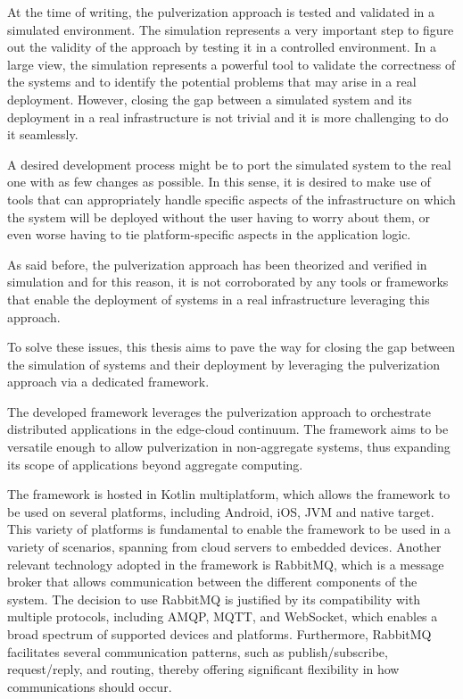 At the time of writing, the pulverization approach is tested and validated in a simulated environment.
The simulation represents a very important step to figure out the validity of the approach by testing it in a controlled environment.
In a large view, the simulation represents a powerful tool to validate the correctness of the systems and to identify the
potential problems that may arise in a real deployment. However, closing the gap between a simulated system and its deployment in a real
infrastructure is not trivial and it is more challenging to do it seamlessly.

A desired development process might be to port the simulated system to the real one with as few changes as possible. In this sense, it is
desired to make use of tools that can appropriately handle specific aspects of the infrastructure on which the system will be deployed without the
user having to worry about them, or even worse having to tie platform-specific aspects in the application logic.

As said before, the pulverization approach has been theorized and verified in simulation and for this reason, it is not corroborated by any tools or
frameworks that enable the deployment of systems in a real infrastructure leveraging this approach.

To solve these issues, this thesis aims to pave the way for closing the gap between the simulation of systems and their deployment by
leveraging the pulverization approach via a dedicated framework.

The developed framework leverages the pulverization approach to orchestrate distributed applications in the edge-cloud continuum.
The framework aims to be versatile enough to allow pulverization in non-aggregate systems, thus expanding its scope of applications beyond aggregate
computing.

The framework is hosted in Kotlin multiplatform, which allows the framework to be used on several platforms, including
Android, iOS, JVM and native target. This variety of platforms is fundamental to enable the framework to be used in a variety of scenarios, spanning
from cloud servers to embedded devices. Another relevant technology adopted in the framework is RabbitMQ, which is a message broker that allows
communication between the different components of the system. The decision to use RabbitMQ is justified by its compatibility with multiple protocols,
including AMQP, MQTT, and WebSocket, which enables a broad spectrum of supported devices and platforms. Furthermore, RabbitMQ facilitates several
communication patterns, such as publish/subscribe, request/reply, and routing, thereby offering significant flexibility in how communications should
occur.

